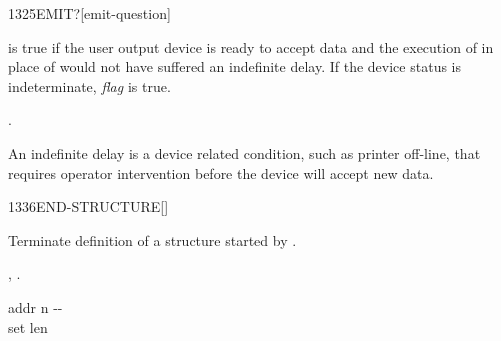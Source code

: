 \begin{worddef}[EMITq]{1325}{EMIT?}[emit-question]
\item {}

	 is true if the user output device is ready to
	accept data and the execution of  in place of
	 would not have suffered an indefinite delay. If
	the device status is indeterminate, \emph{flag} is true.

\see {}.

	\begin{rationale} %
		An indefinite delay is a device related condition, such as
		printer off-line, that requires operator intervention before
		the device will accept new data.
	\end{rationale}
\end{worddef}

\vspace*{-2ex}
\begin{worddef}{1336}{END-STRUCTURE}[]%
\item {}

	Terminate definition of a structure started by
	.

\see {},
	.

	\begin{implement} %

		\word{:} \tab{} addr n -{}- \\
		\tab {} \word{!} \word{;} \tab[4.2] set len
	\end{implement}
\end{worddef}

